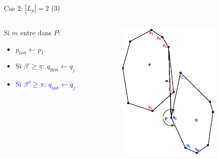 \documentclass{beamer}
\begin{document}
\begin{frame}{Cas 2: $|L_p| = 2$ (3)}
	\begin{columns}[c]
	\begin{column}[T]{.5\textwidth}
		Si $m$ entre dans $P$:
		\begin{itemize}
		\item $p_{\text{last}} \leftarrow p_{1}$
		\item Si $\beta' \geq \pi$: $q_{\text{first}} \leftarrow q_{j}$
		\item \textcolor{blue}{Si $\beta'' \geq \pi$: $q_{\text{last}} \leftarrow q_{j}$}
		\end{itemize}
	\end{column}
	\begin{column}[T]{.5\textwidth}
		\includegraphics[width=5cm]{dmin2_8.eps}
	\end{column}
	\end{columns}
\end{frame}
\end{document}
